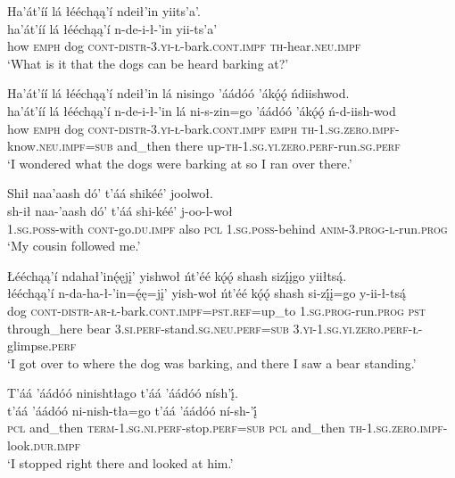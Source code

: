 \ea\label{ex:text6-5-3}
Ha’át’íí lá łééchąą’í ndeił’in yiits’a’.\\
\gll ha’át’íí	lá	łééchąą’í	n-de-i-ł-’in	yii-ts’a’\\
     how	\textsc{emph}	dog	\textsc{cont}-\textsc{distr}-3.\textsc{yi}-\textsc{ł}-bark.\textsc{cont}.\textsc{impf}	\textsc{th}-hear.\textsc{neu}.\textsc{impf}\\
\glt `What is it that the dogs can be heard barking at?'
\z

\ea\label{ex:text6-5-4}
Ha’át’íí lá łééchąą’í ndeił’in lá nisingo ’áádóó ’ákǫ́ǫ́ ńdiishwod.\\
\gll ha’át’íí	lá	łééchąą’í	n-de-i-ł-’in	lá	ni-s-zin=go	’áádóó	’ákǫ́ǫ́	ń-d-iish-wod\\
     how	\textsc{emph}	dog	\textsc{cont}-\textsc{distr}-3.\textsc{yi}-\textsc{ł}-bark.\textsc{cont}.\textsc{impf}	\textsc{emph}	\textsc{th}-1.\textsc{sg}.\textsc{zero}.\textsc{impf}-know.\textsc{neu}.\textsc{impf}=\textsc{sub}	and\_then	there	up-\textsc{th}-1.\textsc{sg}.\textsc{yi}.\textsc{zero}.\textsc{perf}-run.\textsc{sg}.\textsc{perf}\\
\glt `I wondered what the dogs were barking at so I ran over there.'
\z

\ea\label{ex:text6-5-5}
Shił naa’aash dó’ t’áá shikéé’ joolwoł.\\
\gll sh-ił	naa-’aash	dó’	t’áá	shi-kéé’	j-oo-l-woł\\
     1.\textsc{sg}.\textsc{poss}-with	\textsc{cont}-go.\textsc{du}.\textsc{impf}	also	\textsc{pcl}	1.\textsc{sg}.\textsc{poss}-behind	\textsc{anim}-3.\textsc{prog}-\textsc{l}-run.\textsc{prog}\\
\glt `My cousin followed me.'
\z

\ea\label{ex:text6-5-6}
Łééchąą’í ndahał’inę́ęjį’ yishwoł ńt’éé kǫ́ǫ́ shash sizį́įgo yiiłtsą́.\\
\gll łééchąą’í	n-da-ha-ł-’in=ę́ę=jį’	yish-woł	ńt’éé	kǫ́ǫ́	shash	si-zį́į=go	y-ii-ł-tsą́\\
     dog	\textsc{cont}-\textsc{distr}-\textsc{ar}-\textsc{ł}-bark.\textsc{cont}.\textsc{impf}=\textsc{pst}.\textsc{ref}=up\_to	1.\textsc{sg}.\textsc{prog}-run.\textsc{prog}	\textsc{pst}	through\_here	bear	3.\textsc{si}.\textsc{perf}-stand.\textsc{sg}.\textsc{neu}.\textsc{perf}=\textsc{sub}	3.\textsc{yi}-1.\textsc{sg}.\textsc{yi}.\textsc{zero}.\textsc{perf}-\textsc{ł}-glimpse.\textsc{perf}\\
\glt `I got over to where the dog was barking, and there I saw a bear standing.'
\z

\ea\label{ex:text6-5-7}
T’áá ’áádóó ninishtłago t’áá ’áádóó nísh’į́.\\
\gll t’áá	’áádóó	ni-nish-tła=go	t’áá	’áádóó	ní-sh-’į́\\
     \textsc{pcl}	and\_then	\textsc{term}-1.\textsc{sg}.\textsc{ni}.\textsc{perf}-stop.\textsc{perf}=\textsc{sub}	\textsc{pcl}	and\_then	\textsc{th}-1.\textsc{sg}.\textsc{zero}.\textsc{impf}-look.\textsc{dur}.\textsc{impf}\\
\glt `I stopped right there and looked at him.'
\z

